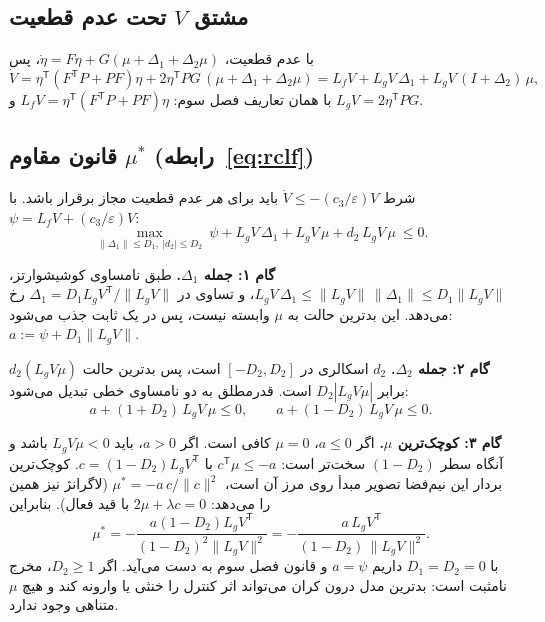 \documentclass[10pt,twocolumn]{article}
\newcommand{\nd}{\lr{\textendash}}
\begin{document}
\subsection{مشتق $V$ تحت عدم قطعیت}
با عدم قطعیت، $\dot\eta=F\eta+G(\mu+\Delta_1+\Delta_2\mu)$، پس
\begin{equation*}
    \dot V=\eta^{\mathsf T}(F^{\mathsf T}P+PF)\eta+2\eta^{\mathsf T}PG\,(\mu+\Delta_1+\Delta_2\mu)
    =L_fV+L_gV\,\Delta_1+L_gV\,(I+\Delta_2)\,\mu ,
\end{equation*}
با همان تعاریف فصل سوم: $L_fV=\eta^{\mathsf T}(F^{\mathsf T}P+PF)\eta$ و
$L_gV=2\eta^{\mathsf T}PG$.

\subsection{قانون مقاوم $\mu^*$ (رابطه~\eqref{eq:rclf})}
شرط $\dot V\le-(c_3/\varepsilon)V$ باید برای \emph{هر} عدم قطعیت مجاز برقرار باشد. با
$\psi=L_fV+(c_3/\varepsilon)V$:
\begin{equation*}
    \max_{\|\Delta_1\|\le D_1,\ |d_2|\le D_2}\ \psi+L_gV\,\Delta_1+L_gV\,\mu+d_2\,L_gV\,\mu\ \le 0 .
\end{equation*}

\textbf{گام ۱: جمله $\Delta_1$.} طبق نامساوی کوشی\nd{}شوارتز،
$L_gV\,\Delta_1\le\|L_gV\|\,\|\Delta_1\|\le D_1\|L_gV\|$، و تساوی در
$\Delta_1=D_1L_gV^{\mathsf T}/\|L_gV\|$ رخ می‌دهد. این بدترین حالت به $\mu$ وابسته نیست،
پس در یک ثابت جذب می‌شود: $a:=\psi+D_1\|L_gV\|$.

\textbf{گام ۲: جمله $\Delta_2$.} $d_2$ اسکالری در $[-D_2,D_2]$ است، پس بدترین حالت
$d_2(L_gV\mu)$ برابر $D_2|L_gV\mu|$ است. قدرمطلق به دو نامساوی خطی تبدیل می‌شود:
\begin{equation*}
    a+(1+D_2)\,L_gV\,\mu\le0,\qquad a+(1-D_2)\,L_gV\,\mu\le0 .
\end{equation*}

\textbf{گام ۳: کوچک‌ترین $\mu$.} اگر $a\le0$، $\mu=0$ کافی است. اگر $a>0$، باید
$L_gV\mu<0$ باشد و آنگاه سطر $(1-D_2)$ سخت‌تر است:
$c^{\mathsf T}\mu\le-a$ با $c=(1-D_2)L_gV^{\mathsf T}$. کوچک‌ترین بردار این نیم‌فضا تصویر
مبدأ روی مرز آن است، $\mu^*=-a\,c/\|c\|^2$ (لاگرانژ نیز همین را می‌دهد:
$2\mu+\lambda c=0$ با قید فعال). بنابراین
\begin{equation*}
    \mu^*=-\frac{a(1-D_2)L_gV^{\mathsf T}}{(1-D_2)^2\|L_gV\|^2}
    =-\frac{a\,L_gV^{\mathsf T}}{(1-D_2)\,\|L_gV\|^2}.
\end{equation*}
با $D_1=D_2=0$ داریم $a=\psi$ و قانون فصل سوم به دست می‌آید. اگر $D_2\ge1$، مخرج
نامثبت است: بدترین مدل درون کران می‌تواند اثر کنترل را خنثی یا وارونه کند و هیچ $\mu$
متناهی وجود ندارد.
\end{document}
